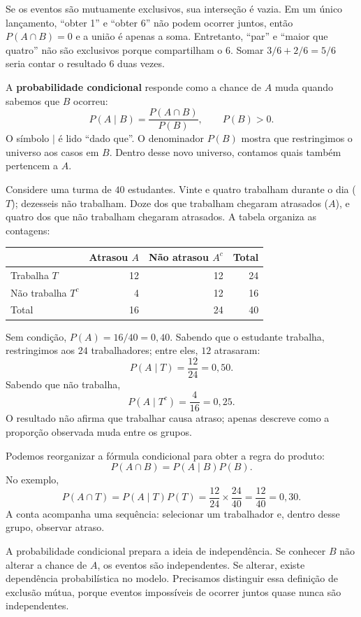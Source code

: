 Se os eventos são mutuamente exclusivos, sua interseção é vazia. Em um único lançamento, ``obter 1'' e ``obter 6'' não podem ocorrer juntos, então $P(A\cap B)=0$ e a união é apenas a soma. Entretanto, ``par'' e ``maior que quatro'' não são exclusivos porque compartilham o $6$. Somar $3/6+2/6=5/6$ seria contar o resultado $6$ duas vezes.

A \textbf{probabilidade condicional} responde como a chance de $A$ muda quando sabemos que $B$ ocorreu:
\[
P(A\mid B)=\frac{P(A\cap B)}{P(B)},\qquad P(B)>0.
\]
O símbolo $\mid$ é lido ``dado que''. O denominador $P(B)$ mostra que restringimos o universo aos casos em $B$. Dentro desse novo universo, contamos quais também pertencem a $A$.

Considere uma turma de $40$ estudantes. Vinte e quatro trabalham durante o dia ($T$); dezesseis não trabalham. Doze dos que trabalham chegaram atrasados ($A$), e quatro dos que não trabalham chegaram atrasados. A tabela organiza as contagens:

\begin{center}
\small
\begin{tabular}{@{}lrrr@{}}
\toprule
 & \textbf{Atrasou $A$} & \textbf{Não atrasou $A^c$} & \textbf{Total} \\
\midrule
Trabalha $T$ & 12 & 12 & 24 \\
Não trabalha $T^c$ & 4 & 12 & 16 \\
\midrule
Total & 16 & 24 & 40 \\
\bottomrule
\end{tabular}
\end{center}

Sem condição, $P(A)=16/40=0{,}40$. Sabendo que o estudante trabalha, restringimos aos $24$ trabalhadores; entre eles, $12$ atrasaram:
\[
P(A\mid T)=\frac{12}{24}=0{,}50.
\]
Sabendo que não trabalha,
\[
P(A\mid T^c)=\frac{4}{16}=0{,}25.
\]
O resultado não afirma que trabalhar causa atraso; apenas descreve como a proporção observada muda entre os grupos.

Podemos reorganizar a fórmula condicional para obter a regra do produto:
\[
P(A\cap B)=P(A\mid B)P(B).
\]
No exemplo,
\[
P(A\cap T)=P(A\mid T)P(T)=\frac{12}{24}\times\frac{24}{40}=\frac{12}{40}=0{,}30.
\]
A conta acompanha uma sequência: selecionar um trabalhador e, dentro desse grupo, observar atraso.

A probabilidade condicional prepara a ideia de independência. Se conhecer $B$ não alterar a chance de $A$, os eventos são independentes. Se alterar, existe dependência probabilística no modelo. Precisamos distinguir essa definição de exclusão mútua, porque eventos impossíveis de ocorrer juntos quase nunca são independentes.

